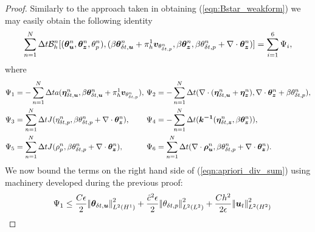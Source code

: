 \begin{proof}

Similarly to the approach taken in obtaining (\ref{eqn:Bstar_weakform}) we may easily obtain the following identity
\begin{eqnarray*}
\sum_{n=1}^{N} \Delta t  \mathcal{B}_{h}^{n}[(\boldsymbol{\theta}^{n}_{\boldsymbol{u}},\boldsymbol{\theta}^{n}_{\boldsymbol{z}},{\theta}^{n}_{{p}} ),( \beta\boldsymbol{\theta}^{n}_{\delta t ,\boldsymbol{u}} + \pi_{h}^{1} \boldsymbol{v}_{\theta_{\delta t, p}^n},  \beta \boldsymbol{\theta}^{n}_{\boldsymbol{z}}, \beta {\theta}^{n}_{\delta t, p} + \nabla \cdot \boldsymbol{\theta}^{n}_{\boldsymbol{z}}  )]  = \sum_{i=1}^{6} \Psi_{i} ,
\label{eqn:apriori_div_sum}
\end{eqnarray*}
where
\begin{equation*}
\begin{gathered}\begin{aligned}
&\Psi_{1} = -\sum^{N}_{n=1} \Delta ta({\boldsymbol{\eta}^{n}_{\delta t, \boldsymbol{u}}},\beta\boldsymbol{\theta}^{n}_{\delta t ,\boldsymbol{u}}+ \pi_{h}^{1} \boldsymbol{v}_{\theta_{\delta t, p}^n}), \\
&\Psi_{3} =  \sum^{N}_{n=1} \Delta t J({\eta}^{n}_{\delta t ,p},\beta {\theta}^{n}_{\delta t, p} + \nabla \cdot \boldsymbol{\theta}^{n}_{\boldsymbol{z}}), \\
&\Psi_{5} =  \sum^{N}_{n=1} \Delta tJ({\rho}_{p}^{n},\beta {\theta}^{n}_{\delta t, p}+\nabla \cdot \boldsymbol{\theta}^{n}_{\boldsymbol{z}} ),
\end{aligned}\end{gathered}
\
\begin{gathered}\begin{aligned}
&\Psi_{2} = -\sum^{N}_{n=1} \Delta t (\nabla \cdot ( \boldsymbol{\eta}^{n}_{\delta t, \boldsymbol{u}} +  \boldsymbol{\eta}^{n}_{\boldsymbol{z}}) ,\nabla \cdot \boldsymbol{\theta}^{n}_{\boldsymbol{z}}  + \beta {\theta}^{n}_{\delta t, p}), \\
&\Psi_{4} = -\sum^{N}_{n=1} \Delta t(\boldsymbol{k^{-1}}(\boldsymbol{\eta}^{n}_{\delta t ,\boldsymbol{z}}, \beta \boldsymbol{\theta}^{n}_{\boldsymbol{z}} )), \\
&\Psi_{6} =  \sum^{N}_{n=1} \Delta t(\nabla \cdot \boldsymbol{\rho}_{\boldsymbol{u}}^{n},\beta {\theta}^{n}_{\delta t, p} +\nabla \cdot \boldsymbol{\theta}^{n}_{\boldsymbol{z}}  ).
\end{aligned}\end{gathered}
\end{equation*}
We now bound the terms on the right hand side of (\ref{eqn:apriori_div_sum}) using machinery developed during the previous proof:
%
\begin{eqnarray}
&&\Psi_{1} \leq  \frac{C\epsilon}{ 2 } \honetimenorm{\auxdisptime}^{2} + \frac{\hat{c}^{2}\epsilon}{ 2 } \ltwotimenorm{\auxptime}^{2} +  \frac{ Ch^2}{2\epsilon} \htwotimenorm{\dispcont_t}^{2} \nonumber \\

\end{eqnarray}
\end{proof}
